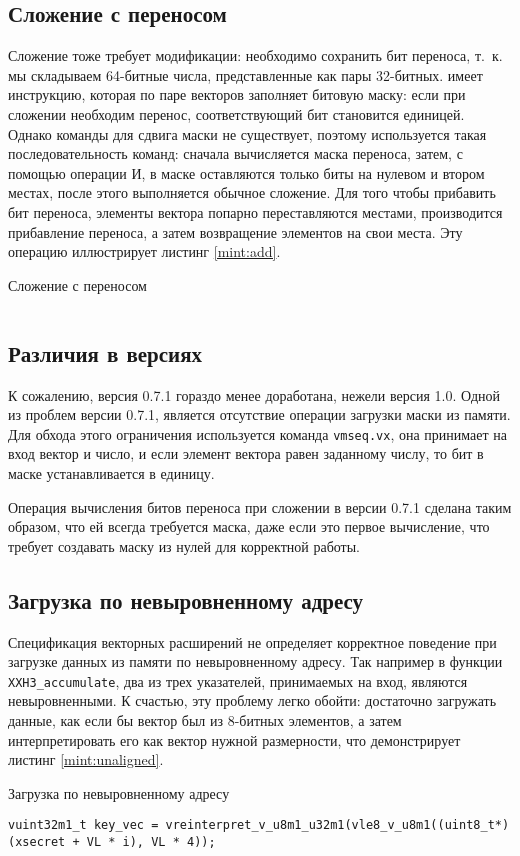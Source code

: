 \subsection{Сложение с переносом}
Сложение тоже требует модификации: необходимо сохранить бит переноса, т.~к. мы складываем 64-битные числа, представленные как пары 32-битных.
\riscv{} имеет инструкцию, которая по паре векторов заполняет битовую маску: если при сложении необходим перенос, соответствующий бит становится единицей.
Однако команды для сдвига маски не существует, поэтому используется такая последовательность команд: сначала вычисляется маска переноса, затем, с помощью операции И, в маске оставляются только биты на нулевом и втором местах, после этого выполняется обычное сложение.
Для того чтобы прибавить бит переноса, элементы вектора попарно переставляются местами, производится прибавление переноса, а затем возвращение элементов на свои места.
Эту операцию иллюстрирует листинг \ref{mint:add}.
\begin{listing}
	\caption{Сложение с переносом}
	\label{mint:add}
	\inputminted[breaklines, frame=single]{c}{figures/add.c}
\end{listing}

\subsection[Различия в версиях RVV]{Различия в версиях \rvv{}}
К сожалению, версия \rvv{} 0.7.1 гораздо менее доработана, нежели версия 1.0.
Одной из проблем версии 0.7.1, является отсутствие операции загрузки маски из памяти.
Для обхода этого ограничения используется команда \texttt{vmseq.vx}, она принимает на вход вектор и число, и если элемент вектора равен заданному числу, то бит в маске устанавливается в единицу.

Операция вычисления битов переноса при сложении в версии 0.7.1 сделана таким образом, что ей всегда требуется маска, даже если это первое вычисление, что требует создавать маску из нулей для корректной работы.

\subsection{Загрузка по невыровненному адресу}
Спецификация векторных расширений \riscv{} не определяет корректное поведение при загрузке данных из памяти по невыровненному адресу.
Так например в функции \texttt{XXH3\_accumulate}, два из трех указателей, принимаемых на вход, являются невыровненными.
К счастью, эту проблему легко обойти: достаточно загружать данные, как если бы вектор был из 8-битных элементов, а затем интерпретировать его как вектор нужной размерности, что демонстрирует листинг \ref{mint:unaligned}.
\begin{listing}
	\caption{Загрузка по невыровненному адресу}
	\label{mint:unaligned}
	\begin{verbatim}
vuint32m1_t key_vec = vreinterpret_v_u8m1_u32m1(vle8_v_u8m1((uint8_t*)(xsecret + VL * i), VL * 4));
	\end{verbatim}
\end{listing}
